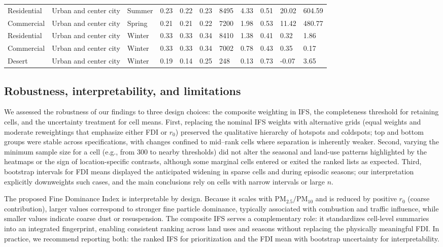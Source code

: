 \documentclass[a4paper,fleqn]{cas-sc}
\begin{document}
\begin{table}[htb]
\begin{tabular}{lllllllllll}
\hline
Residential & Urban and center city & Summer & 0.23 & 0.22 & 0.23 & 8495 & 4.33 & 0.51 & 20.02 & 604.59 \\
Commercial & Urban and center city & Spring & 0.21 & 0.21 & 0.22 & 7200 & 1.98 & 0.53 & 11.42 & 480.77 \\
Residential & Urban and center city & Winter & 0.33 & 0.33 & 0.34 & 8410 & 1.38 & 0.41 & 0.32 & 1.86 \\
Commercial & Urban and center city & Winter & 0.33 & 0.33 & 0.34 & 7002 & 0.78 & 0.43 & 0.35 & 0.17 \\
Desert & Urban and center city & Winter & 0.19 & 0.14 & 0.25 & 248 & 0.13 & 0.73 & -0.07 & 3.65 \\
\hline
\end{tabular}
\end{table}

\subsection{Robustness, interpretability, and limitations}

We assessed the robustness of our findings to three design choices: the composite weighting in IFS, the completeness threshold for retaining cells, and the uncertainty treatment for cell means. First, replacing the nominal IFS weights with alternative grids (equal weights and moderate reweightings that emphasize either FDI or $r_0$) preserved the qualitative hierarchy of hotspots and coldspots; top and bottom groups were stable across specifications, with changes confined to mid–rank cells where separation is inherently weaker. Second, varying the minimum sample size for a cell (e.g., from 300 to nearby thresholds) did not alter the seasonal and land-use patterns highlighted by the heatmaps or the sign of location-specific contrasts, although some marginal cells entered or exited the ranked lists as expected. Third, bootstrap intervals for FDI means displayed the anticipated widening in sparse cells and during episodic seasons; our interpretation explicitly downweights such cases, and the main conclusions rely on cells with narrow intervals or large $n$.

The proposed Fine Dominance Index is interpretable by design. Because it scales with $\mathrm{PM}_{2.5}/\mathrm{PM}_{10}$ and is reduced by positive $r_0$ (coarse contribution), larger values correspond to stronger fine particle dominance, typically associated with combustion and traffic influence, while smaller values indicate coarse dust or resuspension. The composite IFS serves a complementary role: it standardizes cell-level summaries into an integrated fingerprint, enabling consistent ranking across land uses and seasons without replacing the physically meaningful FDI. In practice, we recommend reporting both: the ranked IFS for prioritization and the FDI mean with bootstrap uncertainty for interpretability.
\end{document}
